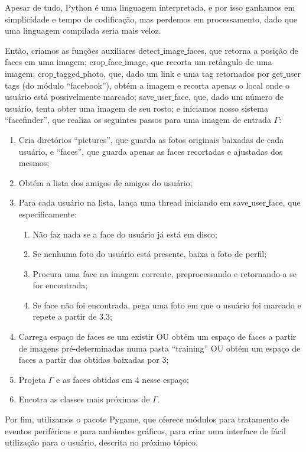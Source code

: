 \documentclass[10pt,a4paper]{article}
\begin{document}
Apesar de tudo, Python é uma linguagem interpretada, e por isso ganhamos em simplicidade e tempo de codificação, mas perdemos em processamento, dado que uma linguagem compilada seria mais veloz.

	Então, criamos as funções auxiliares detect\underline{ }image\underline{ }faces, que retorna a posição de faces em uma imagem; crop\underline{ }face\underline{ }image, que recorta um retângulo de uma imagem; crop\underline{ }tagged\underline{ }photo, que, dado um link e uma tag retornados por get\underline{ }user\underline{ }tags (do módulo “facebook”), obtém a imagem e recorta apenas o local onde o usuário está possivelmente marcado; save\underline{ }user\underline{ }face, que, dado um número de usuário, tenta obter uma imagem de seu rosto; e iniciamos nosso sistema “facefinder”, que realiza os seguintes passos para uma imagem de entrada $\Gamma$:

\begin{enumerate}
	\item Cria diretórios “pictures”, que guarda as fotos originais baixadas de cada usuário, e “faces”, que guarda apenas as faces recortadas e ajustadas dos mesmos;
	\item Obtém a lista dos amigos de amigos do usuário;
	\item Para cada usuário na lista, lança uma thread iniciando
          em save\underline{ }user\underline{ }face, que
          especificamente:
          \begin{enumerate}
          \item Não faz nada se a face do usuário já está em disco;
          \item Se nenhuma foto do usuário está presente, baixa a
            foto de perfil;	
          \item Procura uma face na imagem corrente, preprocessando e retornando-a se for encontrada;
          \item Se face não foi encontrada, pega uma foto em que
            o usuário foi marcado e repete a partir de 3.3;
          \end{enumerate}
	\item Carrega espaço de faces se um existir OU obtém um espaço de faces a partir de imagens pré-determinadas numa pasta “training” OU obtém um espaço de faces a partir das obtidas baixadas por 3;
	\item Projeta $\Gamma$ e as faces obtidas em 4 nesse espaço;
	\item Encotra as classes mais próximas de $\Gamma$.
\end{enumerate}
	Por fim, utilizamos o pacote Pygame, que oferece módulos para tratamento de eventos periféricos e para ambientes gráficos, para criar uma interface de fácil utilização para o usuário, descrita no próximo tópico.
\end{document}
